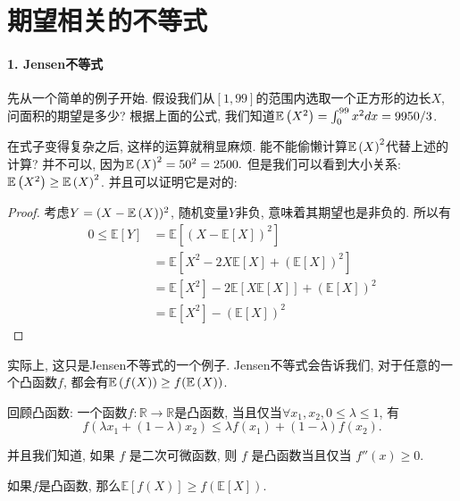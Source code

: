 \section{期望相关的不等式}

\paragraph{1. Jensen不等式} 先从一个简单的例子开始. 假设我们从$[1,99]$的范围内选取一个正方形的边长$X$, 问面积的期望是多少? 根据上面的公式, 我们知道$\mathbb E\left(X^2\right)= \int_{0}^{99} x^2 dx = 9950/3$. 

在式子变得复杂之后, 这样的运算就稍显麻烦. 能不能偷懒计算$\mathbb E\left(X\right)^2$代替上述的计算? 并不可以, 因为$\mathbb E\left(X\right)^2=50^2=2500.$ 但是我们可以看到大小关系: $\mathbb E\left(X^2\right)\geq \mathbb E\left(X\right)^2$. 并且可以证明它是对的: 
\begin{proof}
    考虑$Y=(X-\mathbb E\left(X\right))^2$, 随机变量$Y$非负, 意味着其期望也是非负的. 所以有
    $$
\begin{aligned}
0 \leq \mathbb{E}[Y] & =\mathbb{E}\left[(X-\mathbb{E}[X])^2\right] \\
& =\mathbb{E}\left[X^2-2 X \mathbb{E}[X]+(\mathbb{E}[X])^2\right] \\
& =\mathbb{E}\left[X^2\right]-2 \mathbb{E}[X \mathbb{E}[X]]+(\mathbb{E}[X])^2 \\
& =\mathbb{E}\left[X^2\right]-(\mathbb{E}[X])^2
\end{aligned}
$$
\end{proof}

实际上, 这只是Jensen不等式的一个例子. Jensen不等式会告诉我们, 对于任意的一个凸函数$f$, 都会有$\mathbb E\left(f(X)\right)\geq f(\mathbb E\left(X\right))$. 

\begin{asidebox}
回顾凸函数: 一个函数$f:\mathbb R \to \mathbb R$是凸函数, 当且仅当$\forall x_1, x_2, 0\leq \lambda \leq 1$, 有$$
f\left(\lambda x_1+(1-\lambda) x_2\right) \leq \lambda f\left(x_1\right)+(1-\lambda) f\left(x_2\right) .
$$

并且我们知道, 如果 $f$ 是二次可微函数, 则 $f$ 是凸函数当且仅当 $f''(x)\geq 0$. 
\end{asidebox}

\begin{theorem}
    如果$f$是凸函数, 那么$\mathbb{E}[f(X)] \geq f(\mathbb{E}[X])$. 
\end{theorem}

